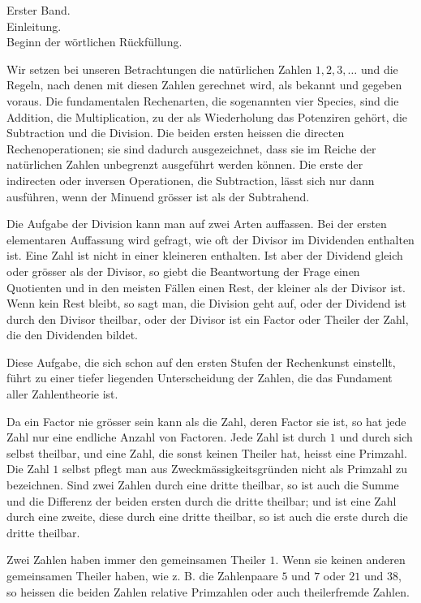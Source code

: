 \documentclass[11pt]{article}
\begin{document}
\begin{center}
{\large Erster Band.}\\[0.5em]
{\Large Einleitung.}\\[0.4em]
{\normalsize Beginn der wörtlichen Rückfüllung.}
\end{center}

Wir setzen bei unseren Betrachtungen die natürlichen Zahlen $1,2,3,\ldots$ und die Regeln, nach denen mit diesen Zahlen gerechnet wird, als bekannt und gegeben voraus. Die fundamentalen Rechenarten, die sogenannten vier Species, sind die Addition, die Multiplication, zu der als Wiederholung das Potenziren gehört, die Subtraction und die Division. Die beiden ersten heissen die directen Rechenoperationen; sie sind dadurch ausgezeichnet, dass sie im Reiche der natürlichen Zahlen unbegrenzt ausgeführt werden können. Die erste der indirecten oder inversen Operationen, die Subtraction, lässt sich nur dann ausführen, wenn der Minuend grösser ist als der Subtrahend.

Die Aufgabe der Division kann man auf zwei Arten auffassen. Bei der ersten elementaren Auffassung wird gefragt, wie oft der Divisor im Dividenden enthalten ist. Eine Zahl ist nicht in einer kleineren enthalten. Ist aber der Dividend gleich oder grösser als der Divisor, so giebt die Beantwortung der Frage einen Quotienten und in den meisten Fällen einen Rest, der kleiner als der Divisor ist. Wenn kein Rest bleibt, so sagt man, die Division geht auf, oder der Dividend ist durch den Divisor theilbar, oder der Divisor ist ein Factor oder Theiler der Zahl, die den Dividenden bildet.

Diese Aufgabe, die sich schon auf den ersten Stufen der Rechenkunst einstellt, führt zu einer tiefer liegenden Unterscheidung der Zahlen, die das Fundament aller Zahlentheorie ist.

Da ein Factor nie grösser sein kann als die Zahl, deren Factor sie ist, so hat jede Zahl nur eine endliche Anzahl von Factoren. Jede Zahl ist durch $1$ und durch sich selbst theilbar, und eine Zahl, die sonst keinen Theiler hat, heisst eine Primzahl. Die Zahl $1$ selbst pflegt man aus Zweckmässigkeitsgründen nicht als Primzahl zu bezeichnen. Sind zwei Zahlen durch eine dritte theilbar, so ist auch die Summe und die Differenz der beiden ersten durch die dritte theilbar; und ist eine Zahl durch eine zweite, diese durch eine dritte theilbar, so ist auch die erste durch die dritte theilbar.

Zwei Zahlen haben immer den gemeinsamen Theiler $1$. Wenn sie keinen anderen gemeinsamen Theiler haben, wie z. B. die Zahlenpaare $5$ und $7$ oder $21$ und $38$, so heissen die beiden Zahlen relative Primzahlen oder auch theilerfremde Zahlen.
\end{document}
